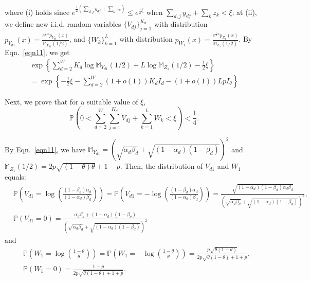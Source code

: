 \documentclass{article}
\newcommand\af{\alpha_d}
\newcommand\bt{\beta_d}
\begin{document}
where (i) holds since $e^{\frac{1}{2} \left( \sum_{d,j} y_{dj} + \sum_{k} z_k \right)} \leq e^{\frac{1}{2} \xi}$ when $\sum_{d,j} y_{dj} + \sum_{k} z_k < \xi$; at (ii), we define new i.i.d. random variables  $\{V_{dj}\}_{j=1}^{K_d}$ with distribution $p_{V_{d1}}(x) = \frac{e^{\frac{1}{2} x} p_{Y_{d1}}(x)}{\mathbb{M}_{Y_{d1}}(1/2)}$, and   $\{W_k\}_{k=1}^L$ with distribution $p_{W_1}(x) = \frac{e^{\frac{1}{2} x} p_{Z_1}(x)}{\mathbb{M}_{Z_1}(1/2)}$.
By Eqn.~\eqref{eqn11}, we get 
\begin{align}\label{pl3e2}
	\exp \left\{ \sum_{d=2}^{W} K_d \log \mathbb{M}_{Y_{d1}}(1/2) + L \log \mathbb{M}_{Z_1}(1/2) - \frac{1}{2} \xi \right\}  \\
 = \exp \left\{ -\frac{1}{2}\xi - \sum_{d=2}^{W}(1+o(1)) K_d I_d - (1+o(1)) L p I_\theta \right\} 
\end{align}

Next, we prove that for a suitable value of $\xi$, 
$$
\mathbb{P} \left( 0< \sum_{d=2}^{W} \sum_{j=1}^{K_d} V_{dj} + \sum_{k=1}^{L} W_k < \xi \right)< \frac{1}{4}.
$$


By Eqn.~\eqref{eqn11}, we have $\mathbb{M}_{Y_{d1}} = \left(\sqrt{\af \bt} + \sqrt{(1-\af)(1-\bt)} \right)^2$ and $ \mathbb{M}_{Z_1}(1/2)=2p\sqrt{(1-\theta)\theta} + 1 - p $. Then, the distribution of ${V_{d1}}$ and $W_1$ equals: 
$$
\begin{aligned}
	&\mathbb{P}\left(V_{d1}=\log \left( \frac{(1-\bt)\af}{(1-\af)\bt} \right)\right) = \mathbb{P}\left(V_{d1}= -\log \left( \frac{(1-\bt)\af}{(1-\af)\bt} \right)\right) = \frac{\sqrt{(1-\af)(1-\bt)\af \bt }}{\left(\sqrt{\af \bt} + \sqrt{(1-\af)(1-\bt)} \right)^2}, \\
	& \mathbb{P} \left( V_{d1} = 0 \right) = \frac{\af \bt + (1-\af)(1-\bt)}{\left(\sqrt{\af \bt} + \sqrt{(1-\af)(1-\bt)} \right)^2} 
\end{aligned} 
$$ and 
$$
\begin{aligned}
	&\mathbb{P}\left(W_1 = \log \left(\frac{1-\theta}{\theta}\right) \right) = \mathbb{P}\left(W_1 = - \log \left(\frac{1-\theta}{\theta}\right) \right) = \frac{p\sqrt{\theta(1-\theta)}}{2p\sqrt{\theta(1-\theta)+ 1+p}}, \\
	& \mathbb{P}(W_1=0) = \frac{1-p}{2p\sqrt{\theta(1-\theta)+ 1+p}}.
\end{aligned}
$$
\end{document}
